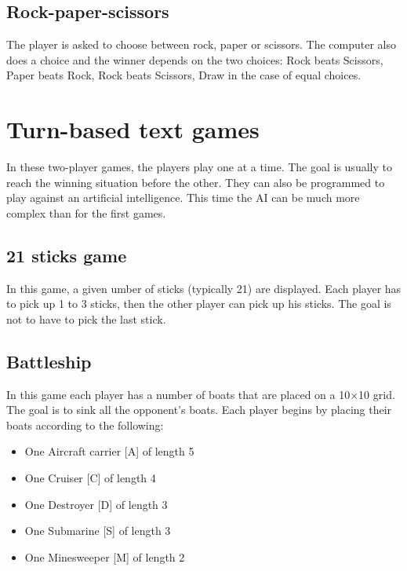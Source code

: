 \documentclass{ecnreport}
\begin{document}
\begin{itemize}
\end{itemize}

\subsection{Rock-paper-scissors}

The player is asked to choose between rock, paper or scissors. The computer also does a choice and the winner depends on the two choices: Rock beats Scissors, Paper beats Rock, Rock beats Scissors, Draw in the case of equal choices.

\begin{itemize}
\end{itemize}

\section{Turn-based text games}

In these two-player games, the players play one at a time. The goal is usually to reach the winning situation before the other.
They can also be programmed to play against an artificial intelligence. This time the AI can be much more complex than for the first games.

\subsection{21 sticks game}

In this game, a given umber of sticks (typically 21) are displayed.
Each player has to pick up 1 to 3 sticks, then the other player can pick up his sticks.
The goal is not to have to pick the last stick.

\begin{itemize}
\end{itemize}

\subsection{Battleship}

In this game each player has a number of boats that are placed on a 10$\times$10 grid. The goal is to sink all the opponent's boats.
Each player begins by placing their boats according to the following:
\begin{itemize}
 \item One Aircraft carrier [A] of length 5
 \item One Cruiser [C] of length 4
 \item One Destroyer [D] of length 3
 \item One Submarine [S] of length 3
 \item One Minesweeper [M] of length 2
\end{itemize}
\end{document}
